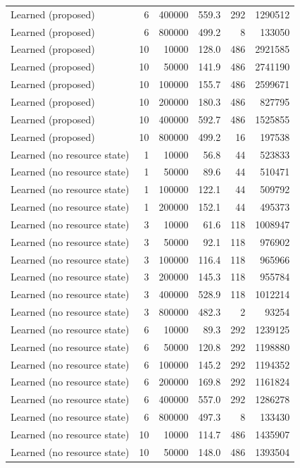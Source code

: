 \begin{table}[h]
\begin{tabular}{@{}lrrrrr@{}}
Learned (proposed) & 6 & 400000 & 559.3 & 292 & 1290512 \\
Learned (proposed) & 6 & 800000 & 499.2 & 8 & 133050 \\
Learned (proposed) & 10 & 10000 & 128.0 & 486 & 2921585 \\
Learned (proposed) & 10 & 50000 & 141.9 & 486 & 2741190 \\
Learned (proposed) & 10 & 100000 & 155.7 & 486 & 2599671 \\
Learned (proposed) & 10 & 200000 & 180.3 & 486 & 827795 \\
Learned (proposed) & 10 & 400000 & 592.7 & 486 & 1525855 \\
Learned (proposed) & 10 & 800000 & 499.2 & 16 & 197538 \\
Learned (no resource state) & 1 & 10000 & 56.8 & 44 & 523833 \\
Learned (no resource state) & 1 & 50000 & 89.6 & 44 & 510471 \\
Learned (no resource state) & 1 & 100000 & 122.1 & 44 & 509792 \\
Learned (no resource state) & 1 & 200000 & 152.1 & 44 & 495373 \\
Learned (no resource state) & 3 & 10000 & 61.6 & 118 & 1008947 \\
Learned (no resource state) & 3 & 50000 & 92.1 & 118 & 976902 \\
Learned (no resource state) & 3 & 100000 & 116.4 & 118 & 965966 \\
Learned (no resource state) & 3 & 200000 & 145.3 & 118 & 955784 \\
Learned (no resource state) & 3 & 400000 & 528.9 & 118 & 1012214 \\
Learned (no resource state) & 3 & 800000 & 482.3 & 2 & 93254 \\
Learned (no resource state) & 6 & 10000 & 89.3 & 292 & 1239125 \\
Learned (no resource state) & 6 & 50000 & 120.8 & 292 & 1198880 \\
Learned (no resource state) & 6 & 100000 & 145.2 & 292 & 1194352 \\
Learned (no resource state) & 6 & 200000 & 169.8 & 292 & 1161824 \\
Learned (no resource state) & 6 & 400000 & 557.0 & 292 & 1286278 \\
Learned (no resource state) & 6 & 800000 & 497.3 & 8 & 133430 \\
Learned (no resource state) & 10 & 10000 & 114.7 & 486 & 1435907 \\
Learned (no resource state) & 10 & 50000 & 148.0 & 486 & 1393504 \\

\end{tabular}
\end{table}
